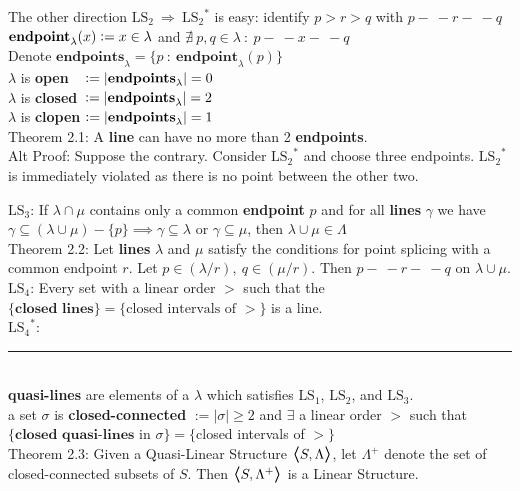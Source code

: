 \documentclass{article}
\newcommand{\hsp}[1][5]{\hspace{0.#1 cm}}
\newcommand{\hcm}[1][1]{\hspace{#1 cm}}
\newcommand{\bra}[1][1.2]{\scalebox{#1}{$\boldsymbol{\langle}$}}
\newcommand{\nl}[1][12]{\\[#1pt]}
\newcommand{\ket}[1][1.2]{\scalebox{#1}{$\boldsymbol{\rangle}$}}
\newcommand{\imp}{\ \Rightarrow\ }
\newcommand{\st}{\ : \ }
\newcommand{\defeq}{\vcentcolon=}
\newcommand{\ch}[1]{\text{#1}}
\newcommand {\chb}[1]{\textbf{#1}}
\newcommand{\seg}{\!-\!\!\!\!\:-}
\begin{document}
\begin{flushleft}
\hcm The other direction $\ch{LS}_2 \imp {\ch{LS}_2}^*$ is easy: identify $p>r>q$ with $p\seg r\seg q$\nl[12]

\hsp[2] $\chb{endpoint}_\lambda(x) \defeq x \in \lambda$ and $\nexists\ p,q \in \lambda \st p\seg x \seg q$\\
\hsp[2] Denote $\chb{endpoints}_\lambda = \{p \st \chb{endpoint}_\lambda(p)\}$\\[6pt]\hsp[2]
$\lambda$ is \chb{open} $\ \ \, \defeq |\chb{endpoints}_\lambda|=0$\\\hsp[2]
$\lambda$ is \chb{closed} $\, \defeq |\chb{endpoints}_\lambda|=2$\\\hsp[2]
$\lambda$ is \chb{clopen}  $\defeq|\chb{endpoints}_\lambda|=1$\nl\hsp[2]
Theorem 2.1: A \chb{line} can have no more than 2 \chb{endpoints}.\\\hcm
{\color{purple}
	Alt Proof: Suppose the contrary. Consider ${\ch{LS}_2}^*$ and choose three endpoints. ${\ch{LS}_2}^*$ is immediately violated as there is no point between the other two.\nl[10]
}

$\ch{LS}_3$: If $\lambda \cap \mu$ contains only a common \chb{endpoint} $p$ and for all \chb{lines} $\gamma$ we have {\color{purple} $\gamma \subseteq (\lambda \cup \mu) - \{p\} \implies \gamma \subseteq \lambda$ or $\gamma \subseteq \mu$}, then $\lambda \cup \mu \in \Lambda$\nl[10]

\hsp[2] Theorem 2.2: Let \chb{lines} $\lambda$ and $\mu$ satisfy the conditions for point splicing with a common endpoint $r$. Let $p \in (\lambda/r),\ q\in (\mu/r)$. Then $p\seg r \seg q$ on $\lambda\cup \mu$.\nl[10]

$\ch{LS}_4$: Every set with a linear order $>$ such that the $\{\chb{closed lines}\} = \{\ch{closed intervals of }>\}$ is a line.\nl[5]

{\color{purple}
	${\ch{LS}_4}^*$:\nl[10]
}

\par\noindent\rule{\textwidth}{0.4pt}\nl[5] %

\chb{quasi-lines} are elements of a $\lambda$ which satisfies $\ch{LS}_1$, $\ch{LS}_2$, and $\ch{LS}_3$.\nl[2]
\hsp[2] a set $\sigma$ is \chb{closed-connected} $ := |\sigma| \geq 2 $ and $\exists$ a linear order $>$ such that \\\hcm$\{\chb{closed quasi-lines}$ in $\sigma\} = \{$closed intervals of $>\}$\nl[10]

\hcm Theorem 2.3: Given a Quasi-Linear Structure $\bra S, \Lambda\ket$, let $\Lambda^+$ denote the set of closed-connected subsets of $S$. Then $\bra S, \Lambda^+\ket $ is a Linear Structure.\nl[20]


\end{flushleft}
\end{document}
